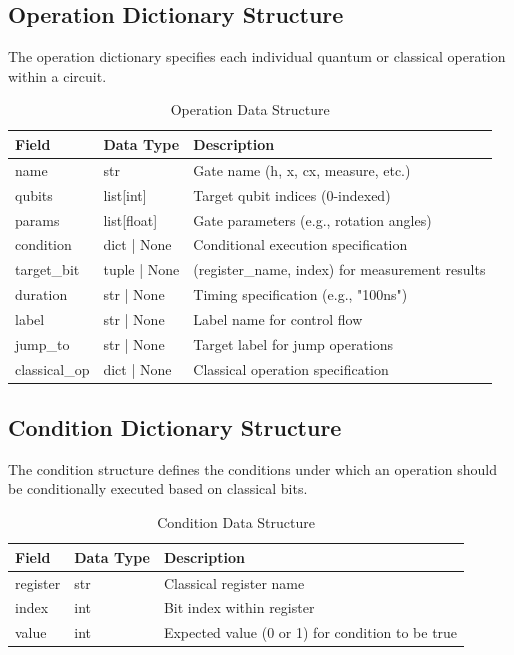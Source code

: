 \subsection{Operation Dictionary Structure}
The operation dictionary specifies each individual quantum or classical operation within a circuit.

\begin{table}[H]
\centering
\caption{Operation Data Structure}
\begin{tabular}{|p{3cm}|p{2.5cm}|p{7cm}|}
\hline
\textbf{Field} & \textbf{Data Type} & \textbf{Description} \\
\hline
name & str & Gate name (h, x, cx, measure, etc.) \\
\hline
qubits & list[int] & Target qubit indices (0-indexed) \\
\hline
params & list[float] & Gate parameters (e.g., rotation angles) \\
\hline
condition & dict | None & Conditional execution specification \\
\hline
target\_bit & tuple | None & (register\_name, index) for measurement results \\
\hline
duration & str | None & Timing specification (e.g., "100ns") \\
\hline
label & str | None & Label name for control flow \\
\hline
jump\_to & str | None & Target label for jump operations \\
\hline
classical\_op & dict | None & Classical operation specification \\
\hline
\end{tabular}
\end{table}

\subsection{Condition Dictionary Structure}
The condition structure defines the conditions under which an operation should be conditionally executed based on classical bits.

\begin{table}[H]
\centering
\caption{Condition Data Structure}
\begin{tabular}{|p{3cm}|p{2.5cm}|p{7cm}|}
\hline
\textbf{Field} & \textbf{Data Type} & \textbf{Description} \\
\hline
register & str & Classical register name \\
\hline
index & int & Bit index within register \\
\hline
value & int & Expected value (0 or 1) for condition to be true \\
\hline
\end{tabular}
\end{table}

